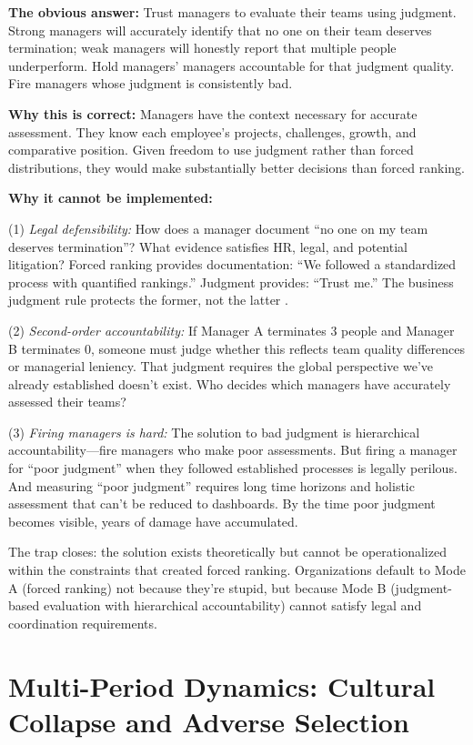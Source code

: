 \documentclass[12pt]{article}
\begin{document}
\textbf{The obvious answer:} Trust managers to evaluate their teams using judgment. Strong managers will accurately identify that no one on their team deserves termination; weak managers will honestly report that multiple people underperform. Hold managers' managers accountable for that judgment quality. Fire managers whose judgment is consistently bad.

\textbf{Why this is correct:} Managers have the context necessary for accurate assessment. They know each employee's projects, challenges, growth, and comparative position. Given freedom to use judgment rather than forced distributions, they would make substantially better decisions than forced ranking.

\textbf{Why it cannot be implemented:}

(1) \emph{Legal defensibility:} How does a manager document ``no one on my team deserves termination''? What evidence satisfies HR, legal, and potential litigation? Forced ranking provides documentation: ``We followed a standardized process with quantified rankings.'' Judgment provides: ``Trust me.'' The business judgment rule protects the former, not the latter \citep{badawi2023business, sharfman2017importance}.

(2) \emph{Second-order accountability:} If Manager A terminates 3 people and Manager B terminates 0, someone must judge whether this reflects team quality differences or managerial leniency. That judgment requires the global perspective we've already established doesn't exist. Who decides which managers have accurately assessed their teams?

(3) \emph{Firing managers is hard:} The solution to bad judgment is hierarchical accountability---fire managers who make poor assessments. But firing a manager for ``poor judgment'' when they followed established processes is legally perilous. And measuring ``poor judgment'' requires long time horizons and holistic assessment that can't be reduced to dashboards. By the time poor judgment becomes visible, years of damage have accumulated.

The trap closes: the solution exists theoretically but cannot be operationalized within the constraints that created forced ranking. Organizations default to Mode A (forced ranking) not because they're stupid, but because Mode B (judgment-based evaluation with hierarchical accountability) cannot satisfy legal and coordination requirements.

\section{Multi-Period Dynamics: Cultural Collapse and Adverse Selection}
\end{document}

